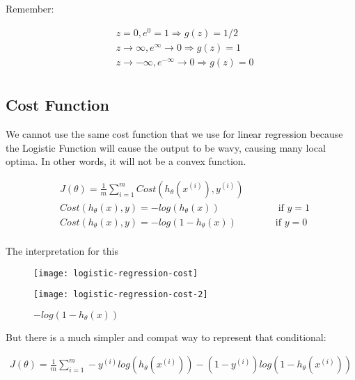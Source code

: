 Remember:

\begin{align*}
	& z = 0, e^0 = 1 \Rightarrow g(z) = 1/2 \\
	& z \to \infty, e^{\infty} \to 0 \Rightarrow g(z) = 1 \\
	& z \to -\infty, e^{-\infty} \to 0 \Rightarrow g(z) = 0 \\
\end{align*}

\subsection{Cost Function}
We cannot use the same cost function that we use for linear regression because the Logistic Function will cause the output to be wavy, causing many local optima. In other words, it will not be a convex function.

\begin{align*}
	& J(\theta) = \frac{1}{m} \sum_{i=1}^{m}Cost(h_{\theta}(x^{(i)}), y^{(i)}) \\
	& Cost(h_{\theta}(x), y) = -log(h_{\theta}(x)) \qquad\qquad\qquad \text{if } y = 1 \\
	& Cost(h_{\theta}(x), y) = -log(1 - h_{\theta}(x)) \qquad\qquad \text{if } y = 0 \\
\end{align*}

The interpretation for this
\begin{figure}[h]
	\begin{multicols}{2}
	\centering
	\texttt{[image: logistic-regression-cost]}
	\caption{$-log(h_{\theta}(x))$}
	\label{fig:logistic-regression-cost}

	\centering
	\texttt{[image: logistic-regression-cost-2]}
	\caption{$-log(1 - h_{\theta}(x))$}
	\label{fig:logistic-regression-cost-2}
	\end{multicols}
\end{figure}

But there is a much simpler and compat way to represent that conditional:

\begin{align}
	J(\theta) = \frac{1}{m} \sum_{i=1}^{m} -y^{(i)}log(h_{\theta}(x^{(i)})) - (1-y^{(i)})log(1 - h_{\theta}(x^{(i)}))
\end{align}

